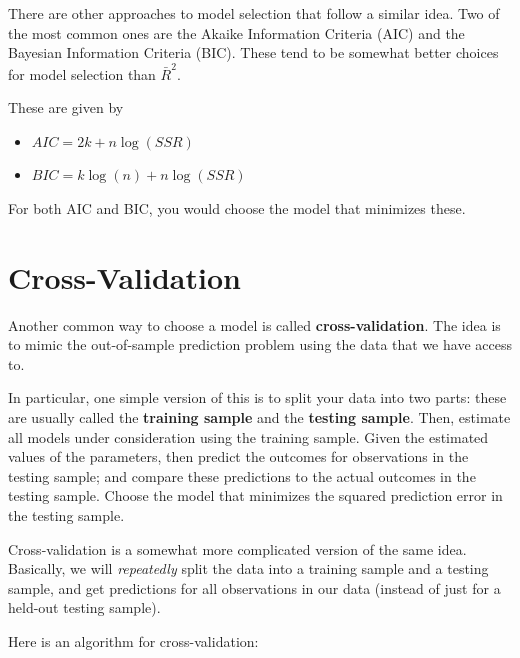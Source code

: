 \documentclass[
  letterpaper,
  DIV=11,
  numbers=noendperiod]{scrreprt}
\providecommand{\tightlist}{%
  \setlength{\itemsep}{0pt}\setlength{\parskip}{0pt}}\usepackage{longtable,booktabs,array}
\begin{document}
There are other approaches to model selection that follow a similar
idea. Two of the most common ones are the Akaike Information Criteria
(AIC) and the Bayesian Information Criteria (BIC). These tend to be
somewhat better choices for model selection than \(\bar{R}^2\).

These are given by

\begin{itemize}
\tightlist
\item
  \(AIC = 2k + n \log(SSR)\)
\item
  \(BIC = k \log(n) + n \log(SSR)\)
\end{itemize}

For both AIC and BIC, you would choose the model that minimizes these.

\section{Cross-Validation}\label{cross-validation}

Another common way to choose a model is called
\textbf{cross-validation}. The idea is to mimic the out-of-sample
prediction problem using the data that we have access to.

In particular, one simple version of this is to split your data into two
parts: these are usually called the \textbf{training sample} and the
\textbf{testing sample}. Then, estimate all models under consideration
using the training sample. Given the estimated values of the parameters,
then predict the outcomes for observations in the testing sample; and
compare these predictions to the actual outcomes in the testing sample.
Choose the model that minimizes the squared prediction error in the
testing sample.

Cross-validation is a somewhat more complicated version of the same
idea. Basically, we will \emph{repeatedly} split the data into a
training sample and a testing sample, and get predictions for all
observations in our data (instead of just for a held-out testing
sample).

Here is an algorithm for cross-validation:
\end{document}

